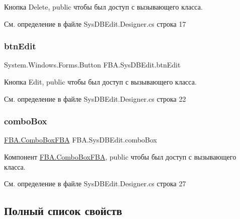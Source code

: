 Кнопка Delete, public чтобы был доступ с вызывающего класса. 



См. определение в файле Sys\+D\+B\+Edit.\+Designer.\+cs строка 17

\mbox{\label{class_f_b_a_1_1_sys_d_b_edit_a915b06dd2badb68f00940c6b72c1d3a4}} 
\subsubsection{\texorpdfstring{btn\+Edit}{btnEdit}}
{\footnotesize\ttfamily System.\+Windows.\+Forms.\+Button F\+B\+A.\+Sys\+D\+B\+Edit.\+btn\+Edit}



Кнопка Edit, public чтобы был доступ с вызывающего класса. 



См. определение в файле Sys\+D\+B\+Edit.\+Designer.\+cs строка 22

\mbox{\label{class_f_b_a_1_1_sys_d_b_edit_ad5e31c513dbdd736a9130300cb6c5807}} 
\subsubsection{\texorpdfstring{combo\+Box}{comboBox}}
{\footnotesize\ttfamily \mbox{\hyperlink{class_f_b_a_1_1_combo_box_f_b_a}{F\+B\+A.\+Combo\+Box\+F\+BA}} F\+B\+A.\+Sys\+D\+B\+Edit.\+combo\+Box}



Компонент \mbox{\hyperlink{class_f_b_a_1_1_combo_box_f_b_a}{F\+B\+A.\+Combo\+Box\+F\+BA}}, public чтобы был доступ с вызывающего класса. 



См. определение в файле Sys\+D\+B\+Edit.\+Designer.\+cs строка 27



\subsection{Полный список свойств}
\mbox{\label{class_f_b_a_1_1_sys_d_b_edit_a67f0d8cf7653dfe7fb11851461f30471}} 
